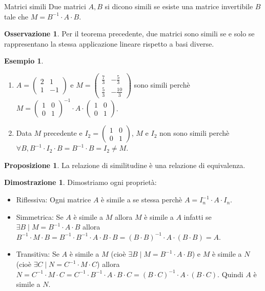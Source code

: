 \documentclass[a4paper]{article}
\theoremstyle{definition}
\newtheorem*{oss}{Osservazione}
\newtheorem*{dimm}{Dimostrazione}
\newtheorem*{es}{Esempio}
\newtheorem*{prop}{Proposizione}
\begin{document}
\begin{deff}{Matrici simili}{}
	Due matrici $A, B$ si dicono simili se esiste una matrice invertibile $B$ tale che $M = B^{-1} \cdot A \cdot B$.
\end{deff}
\begin{oss}
	Per il teorema precedente, due matrici sono simili se e solo se rappresentano la stessa applicazione lineare rispetto a basi diverse.
\end{oss}
\begin{es}
	\begin{enumerate}
		\item $A = \begin{pmatrix}
				      2 & 1  \\
				      1 & -1
			      \end{pmatrix}$ e $M = \begin{pmatrix}
				      \frac{7}{3} & -\frac{5}{3}  \\
				      \frac{5}{3} & -\frac{10}{3}
			      \end{pmatrix}$ sono simili perchè $M = \begin{pmatrix}
				      1 & 0 \\
				      0 & 1
			      \end{pmatrix}^{-1} \cdot A \cdot \begin{pmatrix}
				      1 & 0 \\
				      0 & 1
			      \end{pmatrix}$.
		\item Data $M$ precedente e $I_2 = \begin{pmatrix}
				      1 & 0 \\
				      0 & 1
			      \end{pmatrix}$, $M$ e $I_2$ non sono simili perchè $\forall B, B^{-1} \cdot I_2 \cdot B = B^{-1} \cdot B = I_2 \neq M$.
	\end{enumerate}
\end{es}
\begin{prop}
	La relazione di similitudine è una relazione di equivalenza.
\end{prop}
\begin{dimm}
	Dimostriamo ogni proprietà:
	\begin{itemize}
		\item Riflessiva: Ogni matrice $A$ è simile a se stessa perchè $A = I_n^{-1} \cdot A \cdot I_n$.
		\item Simmetrica: Se $A$ è simile a $M$ allora $M$ è simile a $A$ infatti se $\exists B \mid M = B^{-1} \cdot A \cdot B$ allora $B^{-1} \cdot M \cdot B = B^{-1} \cdot B^{-1} \cdot A \cdot B \cdot B = (B \cdot B)^{-1} \cdot A \cdot (B \cdot B) = A$.
		\item Transitiva: Se $A$ è simile a $M$ (cioè $\exists B \mid M = B^{-1} \cdot A \cdot B$) e $M$ è simile a $N$ (cioè $\exists C \mid N = C^{-1} \cdot M \cdot C$) allora $N = C^{-1} \cdot M \cdot C = C^{-1} \cdot B^{-1} \cdot A \cdot B \cdot C = (B \cdot C)^{-1} \cdot A \cdot (B \cdot C)$.
		      Quindi $A$ è simile a $N$.
	\end{itemize}
\end{dimm}
\end{document}
